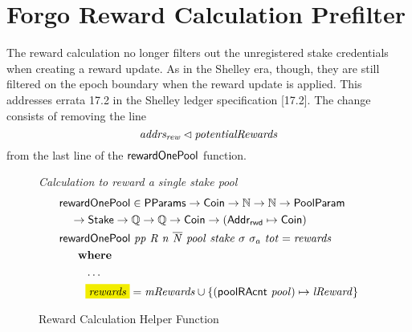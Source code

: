 \newcommand{\Stake}{\type{Stake}}

\section{Forgo Reward Calculation Prefilter}

The reward calculation no longer filters out the unregistered stake
credentials when creating a reward update. As in the Shelley era, though,
they are still filtered on the epoch boundary when the reward update is applied.
This addresses errata 17.2 in the Shelley ledger specification \cite{shelley_spec}[17.2].
The change consists of removing the line
$$\mathit{addrs_{rew}}\lhd{\ensuremath{\mathit{potentialRewards}}}$$
from the last line of the $\mathsf{rewardOnePool}$ function.

\begin{figure}[htb]
  \emph{Calculation to reward a single stake pool}
  \begin{align*}
    & \fun{rewardOnePool} \in \PParams \to \Coin \to \N \to \N \to \PoolParam\\
    & ~~~\to \Stake \to \Q \to \Q \to \Coin \to (\AddrRWD \mapsto \Coin) \\
     & \fun{rewardOnePool}~\var{pp}~\var{R}~\var{n}~\var{\overline{N}}~\var{pool}~\var{stake}~{\sigma}~{\sigma_a}~\var{tot} =
         \var{rewards}\\
     & ~~~\where \\
          & ~~~~~~~\ldots \\
          & ~~~~~~~\hldiff{\var{rewards}} =
               \var{mRewards} \cup
               \{(\fun{poolRAcnt}~\var{pool})\mapsto\var{lReward}\} \\
  \end{align*}
  \caption{Reward Calculation Helper Function}
  \label{fig:functions:reward-calc}
\end{figure}
